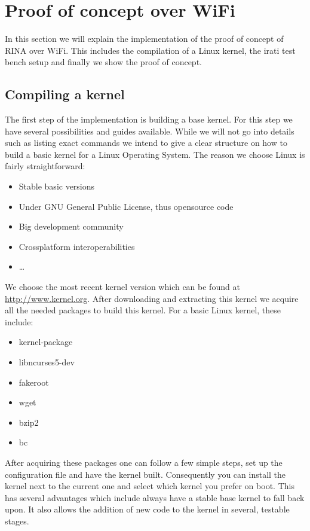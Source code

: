 \section{Proof of concept over WiFi}

In this section we will explain the implementation of the proof of concept of RINA over WiFi. This includes the compilation of a Linux kernel, the irati test bench setup and finally we show the proof of concept. 

\subsection{Compiling a kernel}

The first step of the implementation is building a base kernel. For this step we have several possibilities and guides available. While we will not go into details such as listing exact commands we intend to give a clear structure on how to build a basic kernel for a Linux Operating System. The reason we choose Linux is fairly straightforward:

\begin{itemize}
	\item Stable basic versions
	\item Under GNU General Public License, thus opensource code
	\item Big development community
	\item Crossplatform interoperabilities
	\item \ldots
\end{itemize}

We choose the most recent kernel version which can be found at \url{http://www.kernel.org}. After downloading and extracting this kernel we acquire all the needed packages to build this kernel. For a basic Linux kernel, these include:

\begin{itemize}
	\item kernel-package
	\item libncurses5-dev
	\item fakeroot
	\item wget
	\item bzip2
	\item bc
\end{itemize}

After acquiring these packages one can follow a few simple steps, set up the configuration file and have the kernel built. Consequently you can install the kernel next to the current one and select which kernel you prefer on boot. This has several advantages which include always have a stable base kernel to fall back upon. It also allows the addition of new code to the kernel in several, testable stages. 

